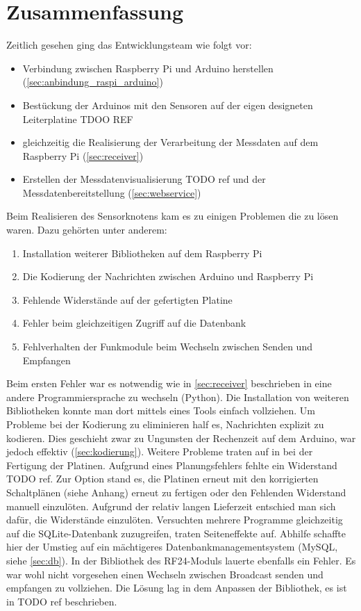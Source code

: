 \section{Zusammenfassung}
Zeitlich gesehen ging das Entwicklungsteam wie folgt vor:
\begin{itemize}
\item Verbindung zwischen Raspberry Pi und Arduino herstellen (\ref{sec:anbindung_raspi_arduino})
\item Bestückung der Arduinos mit den Sensoren auf der eigen designeten Leiterplatine TDOO REF
\item gleichzeitig die Realisierung der Verarbeitung der Messdaten auf dem Raspberry Pi (\ref{sec:receiver})
\item Erstellen der Messdatenvisualisierung TODO ref und der Messdatenbereitstellung (\ref{sec:webservice}) 
\end{itemize}

Beim Realisieren des Sensorknotens kam es zu einigen Problemen die zu lösen waren. Dazu gehörten unter anderem:
\begin{enumerate}
\item Installation weiterer Bibliotheken auf dem Raspberry Pi
\item Die Kodierung der Nachrichten zwischen Arduino und Raspberry Pi
\item Fehlende Widerstände auf der gefertigten Platine
\item Fehler beim gleichzeitigen Zugriff auf die Datenbank
\item Fehlverhalten der Funkmodule beim Wechseln zwischen Senden und Empfangen
\end{enumerate}

Beim ersten Fehler war es notwendig wie in  \ref{sec:receiver} beschrieben in eine andere Programmiersprache zu wechseln (Python). Die Installation von weiteren Bibliotheken konnte man dort mittels eines Tools einfach vollziehen. 
Um Probleme bei der Kodierung zu eliminieren half es, Nachrichten explizit zu kodieren. Dies geschieht zwar zu Ungunsten der Rechenzeit auf dem Arduino, war jedoch effektiv (\ref{sec:kodierung}). 
Weitere Probleme traten auf in bei der Fertigung der Platinen. Aufgrund eines Planungsfehlers fehlte ein Widerstand TODO ref. Zur Option stand es, die Platinen erneut mit den korrigierten Schaltplänen (siehe Anhang) erneut zu fertigen oder den Fehlenden Widerstand manuell einzulöten. Aufgrund der relativ langen Lieferzeit entschied man sich dafür, die Widerstände einzulöten.
Versuchten mehrere Programme gleichzeitig auf die SQLite-Datenbank zuzugreifen, traten Seiteneffekte auf. Abhilfe schaffte hier der Umstieg auf ein mächtigeres Datenbankmanagementsystem (MySQL, siehe \ref{sec:db}).
In der Bibliothek des RF24-Moduls lauerte ebenfalls ein Fehler. Es war wohl nicht vorgesehen einen Wechseln zwischen Broadcast senden und empfangen zu vollziehen. Die Lösung lag in dem Anpassen der Bibliothek, es ist in TODO ref beschrieben.
